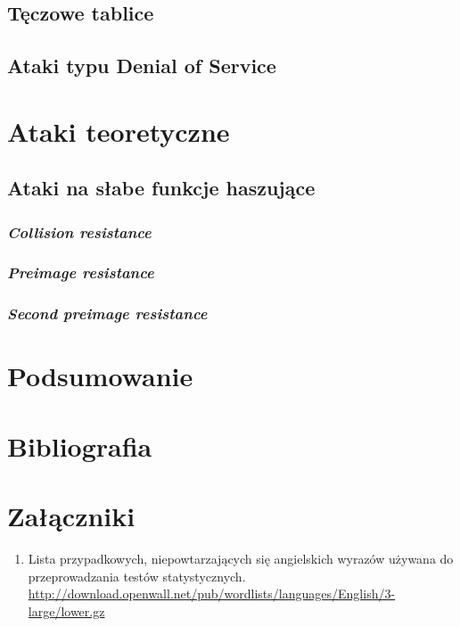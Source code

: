 \documentclass[12pt,a4paper,twoside]{article}
\newcounter{attcounter} %
\begin{document}
\subsection{Tęczowe tablice}

\subsection{Ataki typu Denial of Service}

\section{Ataki teoretyczne}

\subsection{Ataki na słabe funkcje haszujące}

\subsubsection{\textit{Collision resistance}}

\subsubsection{\textit{Preimage resistance}}

\subsubsection{\textit{Second preimage resistance}}

\section{Podsumowanie}

\section{Bibliografia}

\section{Załączniki}

\begin{enumerate}
\item {}\label{att:english_wordlist}Lista
przypadkowych, niepowtarzających się angielskich wyrazów używana do
przeprowadzania testów statystycznych.
\url{http://download.openwall.net/pub/wordlists/languages/English/3-large/lower.gz}
\end{enumerate}
\end{document}
